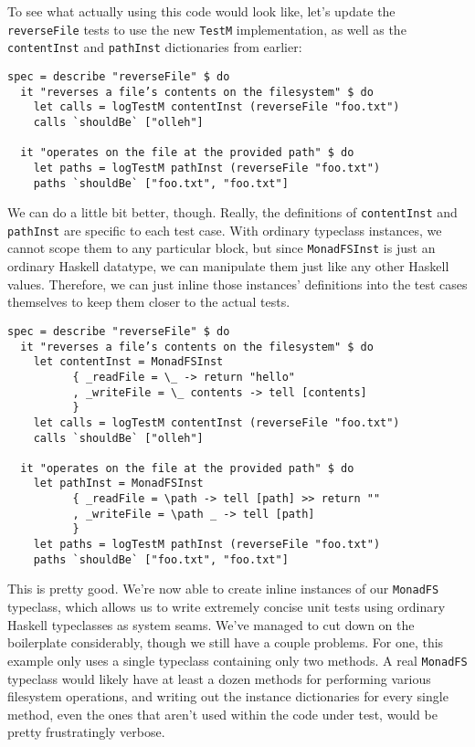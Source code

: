 To see what actually using this code would look like, let's update the
\texttt{reverseFile} tests to use the new \texttt{TestM} implementation,
as well as the \texttt{contentInst} and \texttt{pathInst} dictionaries
from earlier:

\begin{verbatim}
spec = describe "reverseFile" $ do
  it "reverses a file’s contents on the filesystem" $ do
    let calls = logTestM contentInst (reverseFile "foo.txt")
    calls `shouldBe` ["olleh"]

  it "operates on the file at the provided path" $ do
    let paths = logTestM pathInst (reverseFile "foo.txt")
    paths `shouldBe` ["foo.txt", "foo.txt"]
\end{verbatim}

We can do a little bit better, though. Really, the definitions of
\texttt{contentInst} and \texttt{pathInst} are specific to each test
case. With ordinary typeclass instances, we cannot scope them to any
particular block, but since \texttt{MonadFSInst} is just an ordinary
Haskell datatype, we can manipulate them just like any other Haskell
values. Therefore, we can just inline those instances' definitions into
the test cases themselves to keep them closer to the actual tests.

\begin{verbatim}
spec = describe "reverseFile" $ do
  it "reverses a file’s contents on the filesystem" $ do
    let contentInst = MonadFSInst
          { _readFile = \_ -> return "hello"
          , _writeFile = \_ contents -> tell [contents]
          }
    let calls = logTestM contentInst (reverseFile "foo.txt")
    calls `shouldBe` ["olleh"]

  it "operates on the file at the provided path" $ do
    let pathInst = MonadFSInst
          { _readFile = \path -> tell [path] >> return ""
          , _writeFile = \path _ -> tell [path]
          }
    let paths = logTestM pathInst (reverseFile "foo.txt")
    paths `shouldBe` ["foo.txt", "foo.txt"]
\end{verbatim}
This is pretty good. We're now able to create inline instances of our
\texttt{MonadFS} typeclass, which allows us to write extremely concise
unit tests using ordinary Haskell typeclasses as system seams. We've
managed to cut down on the boilerplate considerably, though we still
have a couple problems. For one, this example only uses a single
typeclass containing only two methods. A real \texttt{MonadFS} typeclass
would likely have at least a dozen methods for performing various
filesystem operations, and writing out the instance dictionaries for
every single method, even the ones that aren't used within the code
under test, would be pretty frustratingly verbose.

